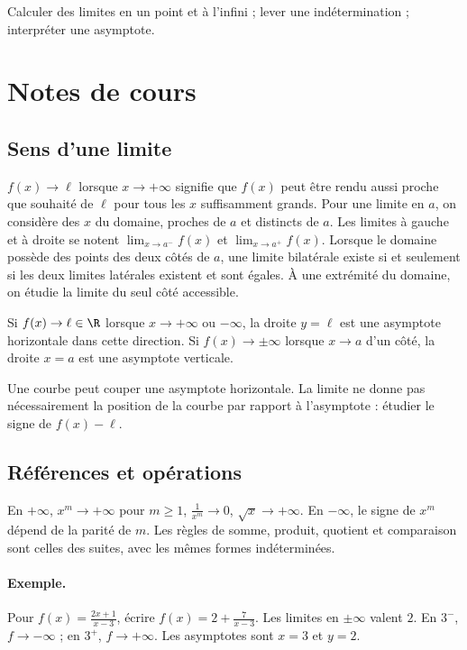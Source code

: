 \label{ch:3}


\begin{keypoint}[Objectifs]Calculer des limites en un point et à l'infini ; lever une indétermination ; interpréter une asymptote.\end{keypoint}

\section{Notes de cours}
\subsection{Sens d'une limite}
$f(x)\to\ell$ lorsque $x\to+\infty$ signifie que $f(x)$ peut être rendu aussi proche que souhaité de $\ell$ pour tous les $x$ suffisamment grands. Pour une limite en $a$, on considère des $x$ du domaine, proches de $a$ et distincts de $a$. Les limites à gauche et à droite se notent $\lim_{x\to a^-}f(x)$ et $\lim_{x\to a^+}f(x)$. Lorsque le domaine possède des points des deux côtés de $a$, une limite bilatérale existe si et seulement si les deux limites latérales existent et sont égales. À une extrémité du domaine, on étudie la limite du seul côté accessible.
\begin{keypoint}
Si $f(x)\to\ell\in\R$ lorsque $x\to+\infty$ ou $-\infty$, la droite $y=\ell$ est une asymptote horizontale dans cette direction. Si $f(x)\to\pm\infty$ lorsque $x\to a$ d'un côté, la droite $x=a$ est une asymptote verticale.
\end{keypoint}
Une courbe peut couper une asymptote horizontale. La limite ne donne pas nécessairement la position de la courbe par rapport à l'asymptote : étudier le signe de $f(x)-\ell$.
\subsection{Références et opérations}
En $+\infty$, $x^m\to+\infty$ pour $m\ge1$, $\frac{1}{x^m}\to0$, $\sqrt x\to+\infty$. En $-\infty$, le signe de $x^m$ dépend de la parité de $m$. Les règles de somme, produit, quotient et comparaison sont celles des suites, avec les mêmes formes indéterminées.
\paragraph{Exemple.} Pour $f(x)=\frac{2x+1}{x-3}$, écrire $f(x)=2+\frac{7}{x-3}$. Les limites en $\pm\infty$ valent $2$. En $3^-$, $f\to-\infty$ ; en $3^+$, $f\to+\infty$. Les asymptotes sont $x=3$ et $y=2$.
